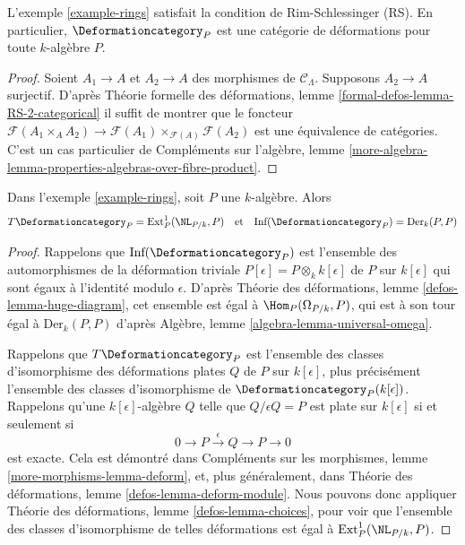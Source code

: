 \begin{lemma}
\label{lemma-rings-RS}
L'exemple \ref{example-rings}
satisfait la condition de Rim-Schlessinger (RS).
En particulier, $\Deformationcategory_P$ est une catégorie de déformations
pour toute $k$-algèbre $P$.
\end{lemma}

\begin{proof}
Soient $A_1 \to A$ et $A_2 \to A$ des morphismes de $\mathcal{C}_\Lambda$.
Supposons $A_2 \to A$ surjectif. D'après Théorie formelle
des déformations, lemme
\ref{formal-defos-lemma-RS-2-categorical}
il suffit de montrer que le foncteur
$\mathcal{F}(A_1 \times_A A_2) \to
\mathcal{F}(A_1) \times_{\mathcal{F}(A)} \mathcal{F}(A_2)$
est une équivalence de catégories.
C'est un cas particulier de Compléments sur l'algèbre, lemme
\ref{more-algebra-lemma-properties-algebras-over-fibre-product}.
\end{proof}

\begin{lemma}
\label{lemma-rings-TI}
Dans l'exemple \ref{example-rings}, soit $P$ une $k$-algèbre. Alors
$$
T\Deformationcategory_P = \text{Ext}^1_P(\NL_{P/k}, P)
\quad\text{et}\quad
\text{Inf}(\Deformationcategory_P) = \text{Der}_k(P, P)
$$
\end{lemma}

\begin{proof}
Rappelons que $\text{Inf}(\Deformationcategory_P)$ est l'ensemble des
automorphismes de la déformation triviale
$P[\epsilon] = P \otimes_k k[\epsilon]$ de $P$ sur $k[\epsilon]$
qui sont égaux à l'identité modulo $\epsilon$.
D'après Théorie des déformations, lemme \ref{defos-lemma-huge-diagram},
cet ensemble est égal à $\Hom_P(\Omega_{P/k}, P)$, qui est à son tour
égal à $\text{Der}_k(P, P)$ d'après
Algèbre, lemme \ref{algebra-lemma-universal-omega}.

\medskip\noindent
Rappelons que $T\Deformationcategory_P$ est l'ensemble des classes d'isomorphisme
des déformations plates $Q$ de $P$ sur $k[\epsilon]$, plus précisément
l'ensemble des classes d'isomorphisme de $\Deformationcategory_P(k[\epsilon])$.
Rappelons qu'une $k[\epsilon]$-algèbre $Q$ telle que $Q/\epsilon Q = P$
est plate sur $k[\epsilon]$ si et seulement si
$$
0 \to P \xrightarrow{\epsilon} Q \to P \to 0
$$
est exacte. Cela est démontré dans Compléments sur les morphismes, lemme
\ref{more-morphisms-lemma-deform}, et, plus généralement, dans
Théorie des déformations, lemme \ref{defos-lemma-deform-module}.
Nous pouvons donc appliquer
Théorie des déformations, lemme \ref{defos-lemma-choices},
pour voir que l'ensemble des classes d'isomorphisme de telles
déformations est égal à $\text{Ext}^1_P(\NL_{P/k}, P)$.
\end{proof}

